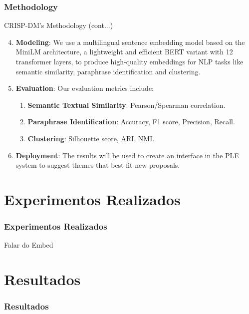 \begin{frame}
	\frametitle{Methodology}
	\begin{block}{CRISP-DM's Methodology (cont...)} %
		\begin{enumerate}
			\setcounter{enumi}{3}
		
			\item \textbf{Modeling}: We use a multilingual sentence embedding model based on the MiniLM architecture, a lightweight and efficient BERT variant with 12 transformer layers, to produce high-quality embeddings for NLP tasks like semantic similarity, paraphrase identification and clustering.
			
			\item \textbf{Evaluation}: Our evaluation metrics include:
			\begin{enumerate}
				\item \textbf{Semantic Textual Similarity}: Pearson/Spearman correlation.
				
				\item \textbf{Paraphrase Identification}: Accuracy, F1 score, Precision, Recall.
				
				\item \textbf{Clustering}: Silhouette score, ARI, NMI.
			\end{enumerate}
	
			
			\item \textbf{Deployment}: The results will be used to create an interface in the PLE system to suggest themes that best fit new proposals.			
		\end{enumerate}
	\end{block}
\end{frame}
\section{Experimentos Realizados}
\begin{frame}
	\frametitle{Experimentos Realizados}
	
	Falar do Embed
	
	
	
\end{frame}
\section{Resultados}
\begin{frame}
	\frametitle{Resultados}
	
	
	
	
\end{frame}
